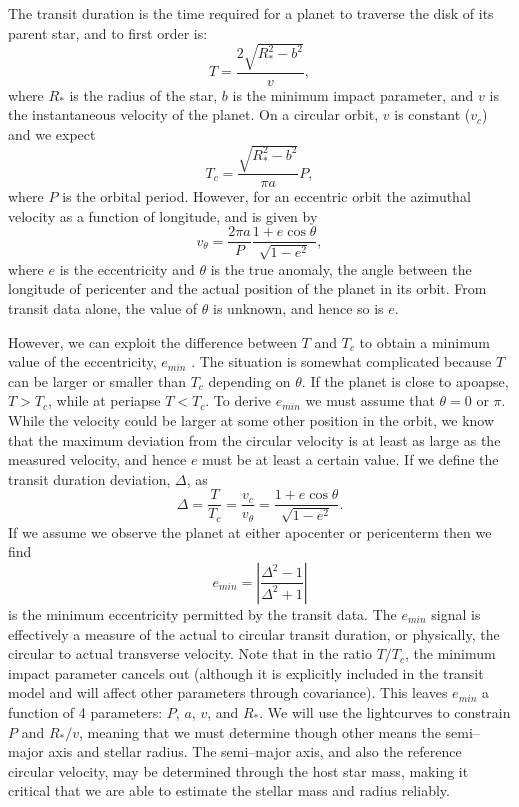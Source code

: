The transit duration is the time required for a planet to traverse the
disk of its parent star, and to first order is:
\begin{equation}\label{eq:duration}
T = \frac{2 \sqrt{R_*^2 - b^2}}{v},
\end{equation}
where $R_*$ is the radius of the star, $b$ is the minimum impact
parameter, and $v$ is the instantaneous velocity of the planet. On a
circular orbit, $v$ is constant ($v_c$) and we expect
\begin{equation}\label{eq:durcirc}
T_c = \frac{\sqrt{R_*^2 - b^2}}{\pi a}P,
\end{equation}
where $P$ is the orbital period. However, for an eccentric orbit the
azimuthal velocity as a function of longitude, and is
given by
\begin{equation}\label{eq:velocity}
v_\theta = \frac{2\pi a}{P}\frac{1+e\cos\theta}{\sqrt{1-e^2}},
\end{equation}
where $e$ is the eccentricity and $\theta$ is the true anomaly, the
angle between the longitude of pericenter and the actual position of
the planet in its orbit. From transit data alone, the value of
$\theta$ is unknown, and hence so is $e$.

However, we can exploit the difference between $T$ and $T_c$ to obtain
a minimum value of the eccentricity, $e_{min}$ \citep{Barnes07}. The
situation is somewhat complicated because $T$ can be larger or smaller
than $T_c$ depending on $\theta$. If the planet is close to apoapse,
$T > T_c$, while at periapse $T < T_c$. To derive $e_{min}$ we must
assume that $\theta = 0$ or $\pi$. While the velocity could be larger
at some other position in the orbit, we know that the maximum
deviation from the circular velocity is at least as large as the
measured velocity, and hence $e$ must be at least a certain value. If
we define the transit duration deviation, $\Delta$, as
\begin{equation}\label{eq:tdd}
\Delta = \frac{T}{T_c} = \frac{v_c}{v_\theta}  = \frac{1+e\cos\theta}{\sqrt{1-e^2}}.
\end{equation}
If we assume we observe the planet at either apocenter or pericenterm then we find
\begin{equation}\label{eq:emin}
e_{min} = \left|\frac{\Delta^2 - 1}{\Delta^2 + 1}\right|
\end{equation}
is the minimum eccentricity permitted by the transit data.  The
$e_{min}$ signal is effectively a measure of the actual to circular
transit duration, or physically, the circular to actual transverse
velocity.  Note that in the ratio $T/T_c$, the minimum impact
parameter cancels out (although it is explicitly included in the
transit model and will affect other parameters through covariance).
This leaves $e_{min}$ a function of 4 parameters: $P$, $a$, $v$, and
$R_*$.  We will use the \kepler lightcurves to constrain $P$ and
$R_*/v$, meaning that we must determine though other means the
semi--major axis and stellar radius.  The semi--major axis, and also
the reference circular velocity, may be determined through the host
star mass, making it critical that we are able to estimate the stellar
mass and radius reliably.

